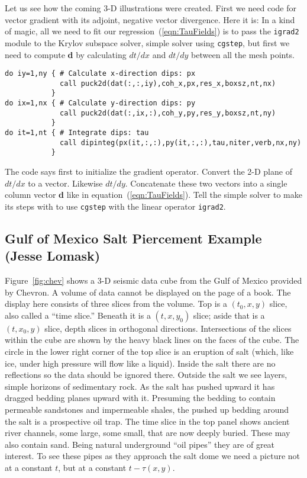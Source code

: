 Let us see how the coming 3-D illustrations were created.
First we need code for vector gradient with its adjoint,
negative vector divergence. Here it is:  
In a kind of magic, all we need to fit our regression~(\ref{eqn:TauFields})
is to pass the {\tt igrad2} 
module to the Krylov subspace solver,
simple solver using {\tt cgstep},
but first we need 
to compute {\bf d} by calculating $dt/dx$ and $dt/dy$ between
all the mesh points. 
\begin{verbatim}
do iy=1,ny { # Calculate x-direction dips: px 
             call puck2d(dat(:,:,iy),coh_x,px,res_x,boxsz,nt,nx) 
           } 
do ix=1,nx { # Calculate y-direction dips: py 
             call puck2d(dat(:,ix,:),coh_y,py,res_y,boxsz,nt,ny) 
           } 
do it=1,nt { # Integrate dips: tau 
             call dipinteg(px(it,:,:),py(it,:,:),tau,niter,verb,nx,ny) 
           } 
\end{verbatim}
The code says first to initialize the gradient operator.
Convert the 2-D plane of $dt/dx$ to a vector.
Likewise $dt/dy$.
Concatenate these two vectors
into a single column vector {\bf d} like in
equation~(\ref{eqn:TauFields}).
Tell the simple solver to make its steps
with to use {\tt cgstep} with the linear operator {\tt igrad2}. 

\subsection{Gulf of Mexico Salt Piercement Example (Jesse Lomask) }
Figure~\ref{fig:chev} shows a 3-D seismic data cube from the Gulf of Mexico provided by 
Chevron. A volume of data cannot be displayed on the page of a book. The display 
here consists of three slices from the volume. Top is a $(t_0 , x , y )$ slice, also called a 
``time slice.'' Beneath it is a $(t , x , y_0 )$ slice; aside that is a $(t , x_0 , y )$ slice, depth slices 
in orthogonal directions. Intersections of the slices within the cube are shown by 
the heavy black lines on the faces of the cube. The circle in the lower right corner 
of the top slice is an eruption of salt (which, like ice, under high pressure will flow 
like a liquid). Inside the salt there are no reflections so the data should be ignored 
there. Outside the salt we see layers, simple horizons of sedimentary rock. As the 
salt has pushed upward it has dragged bedding planes upward with it.
Presuming the bedding to contain permeable sandstones and impermeable shales,
the pushed up bedding around the salt is a prospective oil trap.
The time slice in the top panel shows ancient river channels,
some large, some small, that are now deeply buried. 
These may also contain sand.
Being natural underground ``oil pipes'' they are of great interest.
To see these pipes as they approach the salt dome
we need a picture not at a constant $t$,
but at a constant $t -\tau (x , y )$. 

